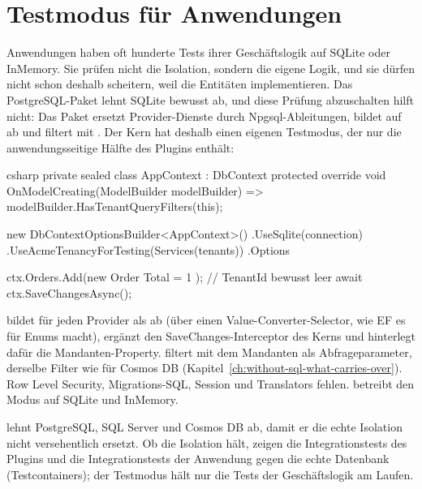 \section{Testmodus für Anwendungen}

Anwendungen haben oft hunderte Tests ihrer Geschäftslogik auf SQLite oder InMemory. Sie prüfen
nicht die Isolation, sondern die eigene Logik, und sie dürfen nicht schon deshalb scheitern,
weil die Entitäten  implementieren. Das PostgreSQL-Paket
lehnt SQLite bewusst ab, und diese Prüfung abzuschalten hilft nicht: Das Paket ersetzt
Provider-Dienste durch Npgsql-Ableitungen, bildet  auf
 ab und filtert mit . Der Kern
hat deshalb einen eigenen Testmodus, der nur die anwendungsseitige Hälfte des Plugins enthält:

\begin{sourcecode}{csharp}
private sealed class AppContext : DbContext
{
    protected override void OnModelCreating(ModelBuilder modelBuilder)
        => modelBuilder.HasTenantQueryFilters(this);
}

new DbContextOptionsBuilder<AppContext>()
    .UseSqlite(connection)
    .UseAcmeTenancyForTesting(Services(tenants))
    .Options

ctx.Orders.Add(new Order { Total = 1 });      // TenantId bewusst leer
await ctx.SaveChangesAsync();
\end{sourcecode}

bildet  für jeden Provider als  ab (über einen
Value-Converter-Selector, wie EF es für Enums macht), ergänzt den SaveChanges-Interceptor des
Kerns und hinterlegt dafür die Mandanten-Property.
 filtert
mit dem Mandanten als Abfrageparameter, derselbe Filter wie für Cosmos DB
(Kapitel~\ref{ch:without-sql-what-carries-over}). Row Level Security, Migrations-SQL, Session
und Translators fehlen.  betreibt den Modus
auf SQLite und InMemory.

\begin{important}
   lehnt
  PostgreSQL, SQL Server und Cosmos DB ab, damit er die echte Isolation nicht versehentlich
  ersetzt. Ob die Isolation hält, zeigen die Integrationstests des Plugins und die
  Integrationstests der Anwendung gegen die echte Datenbank (Testcontainers); der Testmodus
  hält nur die Tests der Geschäftslogik am Laufen.
\end{important}

